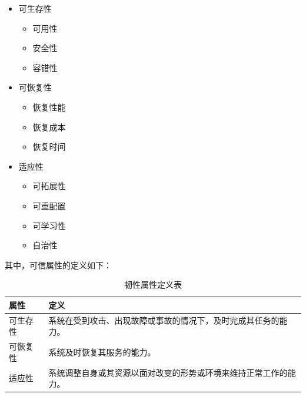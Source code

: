 \documentclass[14pt,a4paper,UTF8,twoside]{article}
\begin{document}
\begin{multicols}{3} %

\begin{itemize}
        \item 可生存性
        \begin{itemize}
            \item 可用性
            \item 安全性
            \item 容错性
        \end{itemize}

        \columnbreak

        \item 可恢复性
        \begin{itemize}
            \item 恢复性能
            \item 恢复成本
            \item 恢复时间
        \end{itemize}

        \columnbreak

        \item 适应性
        \begin{itemize}
            \item 可拓展性
            \item 可重配置
            \item 可学习性
            \item 自治性
        \end{itemize}
\end{itemize}
\end{multicols}


其中，可信属性的定义如下：

\begin{table}[h]
    \centering
    \renewcommand{\arraystretch}{1.5} %
    \begin{tabular}{|m{3cm}|m{10cm}|}
    \hline
    \textbf{属性} & \textbf{定义} \\ \hline
    可生存性 & 系统在受到攻击、出现故障或事故的情况下，及时完成其任务的能力。 \\ \hline
    可恢复性 & 系统及时恢复其服务的能力。 \\ \hline
    适应性 & 系统调整自身或其资源以面对改变的形势或环境来维持正常工作的能力。 \\ \hline
    \end{tabular}
    \caption{韧性属性定义表}
    \end{table}
\end{document}
